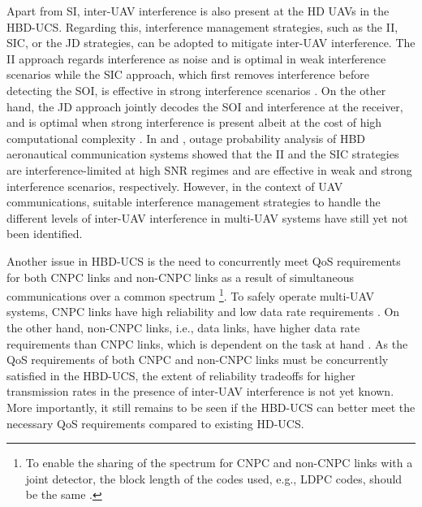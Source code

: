 Apart from SI, inter-UAV interference is also present at the HD UAVs in the HBD-UCS. Regarding this, interference management strategies, such as the II, SIC, or the JD strategies, can be adopted to mitigate inter-UAV interference. The II approach regards interference as noise and is optimal in weak interference scenarios \cite{annapureddy2009gaussian,zahavi2017cooperation} while the SIC approach, which first removes interference before detecting the SOI, is effective in strong interference scenarios \cite{qu2014understanding,weber2007transmission}. On the other hand, the JD approach jointly decodes the SOI and interference at the receiver, and is optimal when strong interference is present albeit at the cost of high computational complexity \cite{zhou2015mac,shubhi2017joint}. In \cite{ernest2018performance} and \cite{ernest2019outage}, outage probability analysis of HBD aeronautical communication systems showed that the II and the SIC strategies are interference-limited at high SNR regimes and are effective in weak and strong interference scenarios, respectively. However, in the context of UAV communications, suitable interference management strategies to handle the different levels of inter-UAV interference in multi-UAV systems have still yet not been identified.

Another issue in HBD-UCS is the need to concurrently meet QoS requirements for both CNPC links and non-CNPC links as a result of simultaneous communications over a common spectrum \footnote{To enable the sharing of the spectrum for CNPC and non-CNPC links with a joint detector, the block length of the codes used, e.g., LDPC codes, should be the same \cite{sharifi2016ldpc}.}. To safely operate multi-UAV systems, CNPC links have high reliability and low data rate requirements \cite{zeng2016wireless}. On the other hand, non-CNPC links, i.e., data links, have higher data rate requirements than CNPC links, which is dependent on the task at hand \cite{zeng2016wireless}. As the QoS requirements of both CNPC and non-CNPC links must be concurrently satisfied in the HBD-UCS, the extent of reliability tradeoffs for higher transmission rates in the presence of inter-UAV interference is not yet known. More importantly, it still remains to be seen if the HBD-UCS can better meet the necessary QoS requirements compared to existing HD-UCS.

